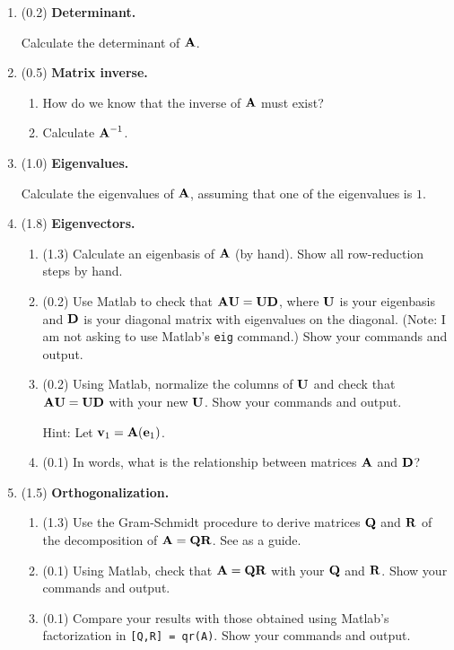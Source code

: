 \documentclass[11pt,titlepage,fleqn]{article}
\begin{document}
\begin{enumerate}
\item (0.2) {\bf Determinant.}

Calculate the determinant of $\mbox{${\bf A}$}$.

\item (0.5) {\bf Matrix inverse.}

\begin{enumerate}
\item How do we know that the inverse of $\mbox{${\bf A}$}$ must exist?
\item Calculate $\mbox{${\bf A}$}^{-1}$.
\end{enumerate}

\item (1.0) {\bf Eigenvalues.}

Calculate the eigenvalues of $\mbox{${\bf A}$}$, assuming that one of the eigenvalues is $1$.

\item (1.8) {\bf Eigenvectors.}

\begin{enumerate}
\item (1.3) Calculate an eigenbasis of $\mbox{${\bf A}$}$ (by hand). Show all row-reduction steps by hand.

\item (0.2) Use Matlab to check that $\mbox{${\bf A}$}\mbox{${\bf U}$} = \mbox{${\bf U}$}\mbox{${\bf D}$}$, where $\mbox{${\bf U}$}$ is your eigenbasis and $\mbox{${\bf D}$}$ is your diagonal matrix with eigenvalues on the diagonal. (Note: I am not asking to use Matlab's \verb+eig+ command.) Show your commands and output.

\item (0.2) Using Matlab, normalize the columns of $\mbox{${\bf U}$}$ and check that $\mbox{${\bf A}$}\mbox{${\bf U}$} = \mbox{${\bf U}$}\mbox{${\bf D}$}$ with your new $\mbox{${\bf U}$}$. Show your commands and output.

Hint: Let $\mbox{${\bf v}$}_1 = \mbox{${\bf A}$}(\mbox{${\bf e}$}_1)$.

\item (0.1) In words, what is the relationship between matrices $\mbox{${\bf A}$}$ and $\mbox{${\bf D}$}$?
\end{enumerate}

\pagebreak
\item (1.5) {\bf Orthogonalization.}

\begin{enumerate}
\item (1.3) Use the Gram-Schmidt procedure to derive matrices $\mbox{${\bf Q}$}$ and $\mbox{${\bf R}$}$ of the decomposition of $\mbox{${\bf A}$} = \mbox{${\bf Q}$}\mbox{${\bf R}$}$. See  as a guide.

\item (0.1) Using Matlab, check that $\mbox{${\bf A}$} = \mbox{${\bf Q}$}\mbox{${\bf R}$}$ with your $\mbox{${\bf Q}$}$ and $\mbox{${\bf R}$}$. Show your commands and output.

\item (0.1) Compare your results with those obtained using Matlab's factorization in \verb+[Q,R] = qr(A)+. Show your commands and output.
\end{enumerate}

\end{enumerate}
\end{document}

